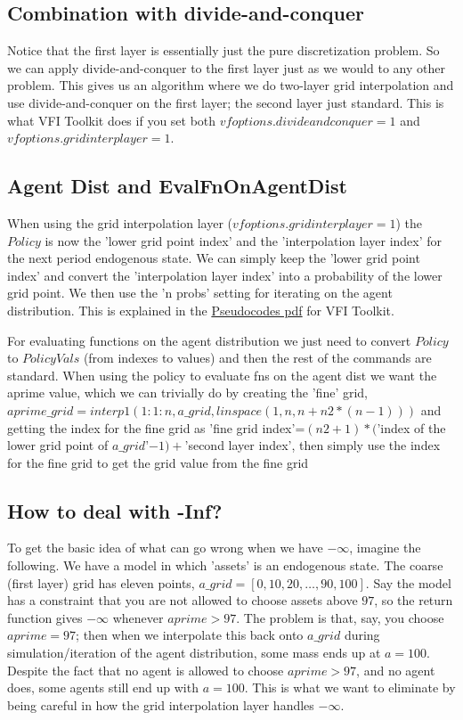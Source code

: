 \documentclass[11pt,fleqn]{article}
\begin{document}
\subsection*{Combination with divide-and-conquer}
Notice that the first layer is essentially just the pure discretization problem. So we can apply divide-and-conquer to the first layer just as we would to any other problem. This gives us an algorithm where we do two-layer grid interpolation and use divide-and-conquer on the first layer; the second layer just standard. This is what VFI Toolkit does if you set both $vfoptions.divideandconquer=1$ and $vfoptions.gridinterplayer=1$.

\subsection*{Agent Dist and EvalFnOnAgentDist}
When using the grid interpolation layer ($vfoptions.gridinterplayer=1$) the $Policy$ is now the 'lower grid point index' and the 'interpolation layer index' for the next period endogenous state. We can simply keep the 'lower grid point index' and convert the 'interpolation layer index' into a probability of the lower grid point. We then use the 'n probs' setting for iterating on the agent distribution. This is explained in the \href{https://github.com/vfitoolkit/Pseudocodes/blob/main/VFI_PseudoCodes.pdf}{Pseudocodes pdf} for VFI Toolkit.


For evaluating functions on the agent distribution we just need to convert $Policy$ to $PolicyVals$ (from indexes to values) and then the rest of the commands are standard. When using the policy to evaluate fns on the agent dist we want the aprime value, which we can trivially do by creating the 'fine' grid, $aprime\_{}grid=interp1(1:1:n,a\_{}grid,linspace(1,n,n+n2*(n-1)))$ and getting the index for the fine grid as 'fine grid index'=$(n2+1)*($'index of the lower grid point of $a\_{}grid$'$ -1)+$'second layer index', then simply use the index for the fine grid to get the grid value from the fine grid


\subsection*{How to deal with -Inf?}
To get the basic idea of what can go wrong when we have $-\infty$, imagine the following. We have a model in which 'assets' is an endogenous state. The coarse (first layer) grid has eleven points, $a\_{}grid=[0,10,20,\dots,90,100]$. Say the model has a constraint that you are not allowed to choose assets above $97$, so the return function gives $-\infty$ whenever $aprime>97$. The problem is that, say, you choose $aprime=97$; then when we interpolate this back onto $a\_{}grid$ during simulation/iteration of the agent distribution, some mass ends up at $a=100$. Despite the fact that no agent is allowed to choose $aprime>97$, and no agent does, some agents still end up with $a=100$. This is what we want to eliminate by being careful in how the grid interpolation layer handles $-\infty$.
\end{document}
